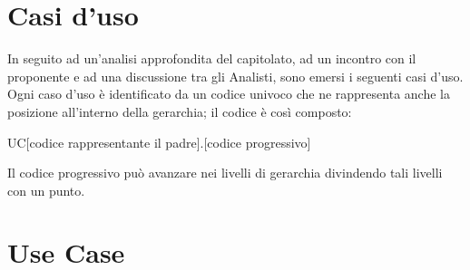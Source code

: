 \section{Casi d'uso}
In seguito ad un'analisi approfondita del capitolato, ad un incontro con il proponente \Zucchetti e ad una discussione tra gli Analisti, sono emersi i seguenti casi d'uso.\\
Ogni caso d'uso è identificato da un codice univoco che ne rappresenta anche la posizione all'interno della gerarchia; il codice è così composto:
\begin{center}
UC[codice rappresentante il padre].[codice progressivo]
\end{center}
Il codice progressivo può avanzare nei livelli di gerarchia divindendo tali livelli con un punto.

\newpage





\section{Use Case}
